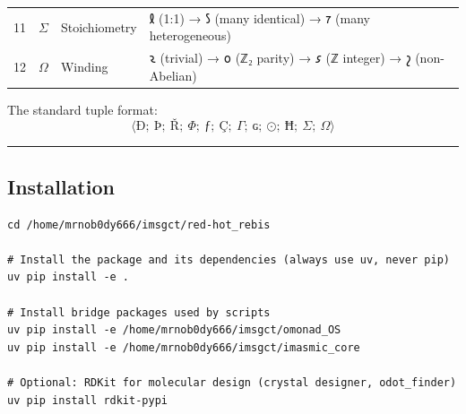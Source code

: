 \begin{longtable}[]{@{}llll@{}}
\begin{minipage}[t]{0.07\columnwidth}\raggedright
11\strut
\end{minipage} & \begin{minipage}[t]{0.24\columnwidth}\raggedright
\(Σ\)\strut
\end{minipage} & \begin{minipage}[t]{0.13\columnwidth}\raggedright
Stoichiometry\strut
\end{minipage} & \begin{minipage}[t]{0.44\columnwidth}\raggedright
𐑙 (1:1) → 𐑕 (many identical) → 𐑳 (many heterogeneous)\strut
\end{minipage}\tabularnewline
\begin{minipage}[t]{0.07\columnwidth}\raggedright
12\strut
\end{minipage} & \begin{minipage}[t]{0.24\columnwidth}\raggedright
\(Ω\)\strut
\end{minipage} & \begin{minipage}[t]{0.13\columnwidth}\raggedright
Winding\strut
\end{minipage} & \begin{minipage}[t]{0.44\columnwidth}\raggedright
𐑷 (trivial) → 𐑴 (ℤ₂ parity) → 𐑭 (ℤ integer) → 𐑟 (non-Abelian)\strut
\end{minipage}\tabularnewline
\bottomrule
\end{longtable}

The standard tuple format:
\[\langle Ð;\ Þ;\ Ř;\ Φ;\ ƒ;\ Ç;\ Γ;\ ɢ;\ ⊙;\ Ħ;\ Σ;\ Ω \rangle\]

\begin{center}\rule{0.5\linewidth}{0.5pt}\end{center}

\hypertarget{installation}{%
\subsection{Installation}\label{installation}}

\begin{verbatim}
cd /home/mrnob0dy666/imsgct/red-hot_rebis

# Install the package and its dependencies (always use uv, never pip)
uv pip install -e .

# Install bridge packages used by scripts
uv pip install -e /home/mrnob0dy666/imsgct/omonad_OS
uv pip install -e /home/mrnob0dy666/imsgct/imasmic_core

# Optional: RDKit for molecular design (crystal designer, odot_finder)
uv pip install rdkit-pypi
\end{verbatim}

